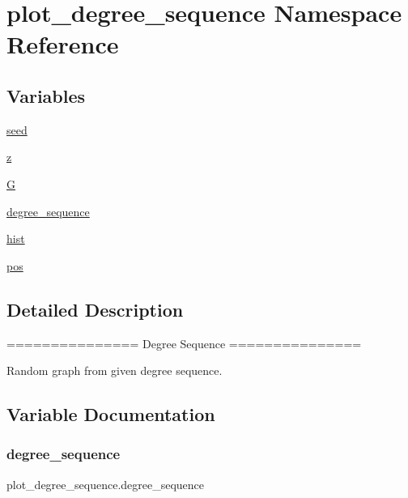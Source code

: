 \hypertarget{namespaceplot__degree__sequence}{}\section{plot\+\_\+degree\+\_\+sequence Namespace Reference}
\label{namespaceplot__degree__sequence}
\subsection*{Variables}
\begin{DoxyCompactItemize}
\item 
\hyperlink{namespaceplot__degree__sequence_a1c3b66c5247d9b59b14cfc48c1c59454}{seed}
\item 
\hyperlink{namespaceplot__degree__sequence_a8a9b405a757254162322996f44b18abe}{z}
\item 
\hyperlink{namespaceplot__degree__sequence_a55076e688d23ada061176eece9d919a5}{G}
\item 
\hyperlink{namespaceplot__degree__sequence_a26c03565abeff06802d9840f6d50584c}{degree\+\_\+sequence}
\item 
\hyperlink{namespaceplot__degree__sequence_a2e8f30850f94b935facf129e6dd9228f}{hist}
\item 
\hyperlink{namespaceplot__degree__sequence_a59c976ad5c91dd214435ff8606278a32}{pos}
\end{DoxyCompactItemize}


\subsection{Detailed Description}
\begin{DoxyVerb}===============
Degree Sequence
===============

Random graph from given degree sequence.
\end{DoxyVerb}
 

\subsection{Variable Documentation}
\mbox{\label{namespaceplot__degree__sequence_a26c03565abeff06802d9840f6d50584c}} 
\subsubsection{\texorpdfstring{degree\+\_\+sequence}{degree\_sequence}}
{\footnotesize\ttfamily plot\+\_\+degree\+\_\+sequence.\+degree\+\_\+sequence}

